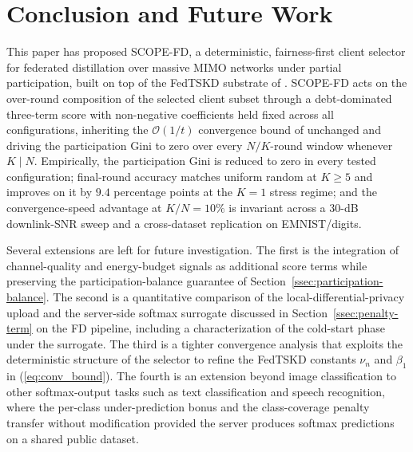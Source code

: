 \documentclass[journal]{IEEEtran}
\newcommand{\new}[1]{#1}
\newcommand{\revIVE}[1]{#1}
\begin{document}
\section{Conclusion and Future Work}
\label{sec:conclusion}
This paper has proposed SCOPE-FD, a deterministic, fairness-first client selector for federated distillation over massive MIMO networks under partial participation, built on top of the FedTSKD substrate of \cite{mu2024fedtskd}. SCOPE-FD acts on the over-round composition of the selected client subset through a debt-dominated three-term score with non-negative coefficients held fixed across all configurations, inheriting the $\mathcal{O}(1/t)$ convergence bound of \cite{mu2024fedtskd} unchanged and \revIVE{driving the participation Gini to zero over every $N/K$-round window whenever $K \mid N$}. Empirically, the participation Gini is reduced to zero in every tested configuration; final-round accuracy matches uniform random at $K \ge 5$ and improves on it by $9.4$ percentage points at the $K = 1$ stress regime; and the convergence-speed advantage at $K/N = 10\%$ is invariant across a $30$-dB downlink-SNR sweep and a cross-dataset replication on EMNIST/digits.

\new{

Several extensions are left for future investigation. The first is the integration of channel-quality and energy-budget signals as additional score terms while preserving the participation-balance guarantee of Section~\ref{ssec:participation-balance}. The second is a quantitative comparison of the local-differential-privacy upload and the server-side softmax surrogate discussed in Section~\ref{ssec:penalty-term} on the FD pipeline, including a characterization of the cold-start phase under the surrogate. The third is a tighter convergence analysis that exploits the deterministic structure of the selector to refine the FedTSKD constants $\nu_n$ and $\beta_1$ in (\ref{eq:conv_bound}). The fourth is an extension beyond image classification to other softmax-output tasks such as text classification and speech recognition, where the per-class under-prediction bonus and the class-coverage penalty transfer without modification provided the server produces softmax predictions on a shared public dataset.}
\balance

{\setlength{\itemsep}{0pt plus 0.2ex}\setlength{\parsep}{0pt}
}
\end{document}
